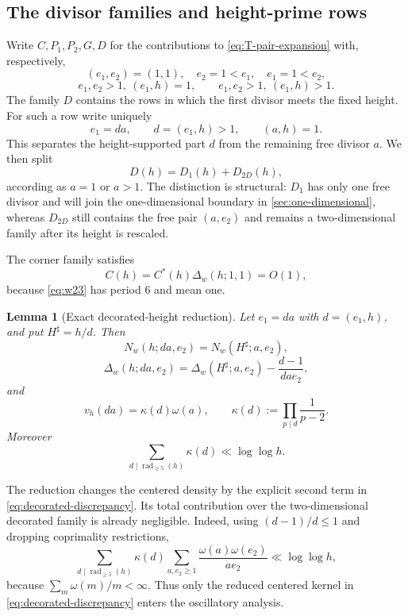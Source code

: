 \documentclass[11pt]{article}
\newtheorem{lemma}[lemma]{Lemma}
\theoremstyle{definition}
\theoremstyle{remark}
\newcommand{\rad}{\operatorname{rad}}
\newcommand{\1}{\mathbf 1}
\newcommand{\om}{\omega}
\newcommand{\llog}{\log\log}
\begin{document}
\subsection{The divisor families and height-prime rows}\label{sec:family-decomposition}
Write $C,P_1,P_2,G,D$ for the contributions to \cref{eq:T-pair-expansion} with, respectively,
\[
(e_1,e_2)=(1,1),\quad e_2=1<e_1,\quad e_1=1<e_2,
\]
\[
e_1,e_2>1,\ (e_1,h)=1,\qquad
 e_1,e_2>1,\ (e_1,h)>1.
\]
The family $D$ contains the rows in which the first divisor meets the fixed height.  For such a row write uniquely
\[
e_1=da,\qquad d=(e_1,h)>1,\qquad (a,h)=1.
\]
This separates the height-supported part $d$ from the remaining free divisor $a$.  We then split
\begin{equation}\label{eq:degenerate-split}
D(h)=D_1(h)+D_{2D}(h),
\end{equation}
according as $a=1$ or $a>1$.  The distinction is structural: $D_1$ has only one free divisor and will join the one-dimensional boundary in \cref{sec:one-dimensional}, whereas $D_{2D}$ still contains the free pair $(a,e_2)$ and remains a two-dimensional family after its height is rescaled.

The corner family satisfies
\begin{equation}\label{eq:corner-bound}
C(h)=C^*(h)\Delta_w(h;1,1)=O(1),
\end{equation}
because \cref{eq:w23} has period $6$ and mean one.

\begin{lemma}[Exact decorated-height reduction]\label{lem:decorated-reduction}
Let $e_1=da$ with $d=(e_1,h)$, and put $H^\sharp=h/d$.  Then
\begin{equation}\label{eq:decorated-root}
N_w(h;da,e_2)=N_w(H^\sharp;a,e_2),
\end{equation}
\begin{equation}\label{eq:decorated-discrepancy}
\Delta_w(h;da,e_2)
 =\Delta_w(H^\sharp;a,e_2)-\frac{d-1}{dae_2},
\end{equation}
and
\begin{equation}\label{eq:decorated-weight}
v_h(da)=\kappa(d)\om(a),\qquad
\kappa(d):=\prod_{p\mid d}\frac1{p-2}.
\end{equation}
Moreover
\begin{equation}\label{eq:decoration-norm}
\sum_{d\mid\rad_{\ge5}(h)}\kappa(d)\ll\llog h.
\end{equation}
\end{lemma}

The reduction changes the centered density by the explicit second term in \cref{eq:decorated-discrepancy}.  Its total contribution over the two-dimensional decorated family is already negligible.  Indeed, using
$(d-1)/d\le1$ and dropping coprimality restrictions,
\begin{equation}\label{eq:decorated-density-correction}
\sum_{d\mid\rad_{\ge5}(h)}\kappa(d)
 \sum_{a,e_2\ge1}\frac{\om(a)\om(e_2)}{ae_2}
 \ll \llog h,
\end{equation}
because $\sum_m\om(m)/m<\infty$.  Thus only the reduced centered kernel in
\cref{eq:decorated-discrepancy} enters the oscillatory analysis.
\end{document}
